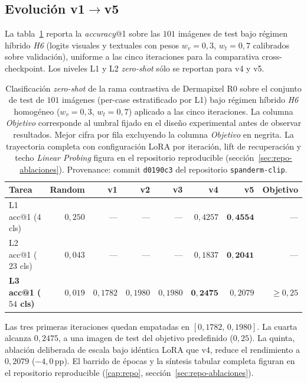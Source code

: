 \subsection{Evolución v1$\to$v5}

La tabla~\ref{tab:spanderm-zs} reporta la \emph{accuracy}@1 sobre las
$101$ imágenes de test bajo régimen híbrido \emph{H6} (logits visuales
y textuales con pesos $w_v = 0{,}3$, $w_t = 0{,}7$ calibrados sobre
validación), uniforme a las cinco iteraciones para la comparativa
cross-checkpoint. Los niveles L1 y L2 \emph{zero-shot} sólo se reportan
para v4 y v5.

\begin{table}[htbp]
\centering
\footnotesize
\setlength{\tabcolsep}{3pt}
\renewcommand{\arraystretch}{0.95}
\caption{Clasificación \emph{zero-shot} de la rama contrastiva de
Dermapixel R0 sobre el
conjunto de test de $101$ imágenes (per-case estratificado por
L1) bajo régimen híbrido \emph{H6} homogéneo
($w_v = 0{,}3$, $w_t = 0{,}7$) aplicado a las cinco iteraciones.
La columna \emph{Objetivo} corresponde al umbral fijado en el
diseño experimental antes de observar resultados. Mejor cifra
por fila excluyendo la columna \emph{Objetivo} en negrita.
La trayectoria completa con configuración LoRA por iteración,
lift de recuperación y techo \emph{Linear Probing} figura en el
repositorio reproducible (sección~\ref{sec:repo-ablaciones}).
Provenance: commit \texttt{d0190c3} del repositorio
\texttt{spanderm-clip}.}
\label{tab:spanderm-zs}
\begin{tabular}{lrrrrrrr}
\hline
Tarea                        & Random    & v1                  & v2                  & v3                  & v4                  & v5                  & Objetivo \\
\hline
L1 acc@1 ($4$ cls)            & $0{,}250$ & ---                 & ---                 & ---                 & $0{,}4257$          & $\mathbf{0{,}4554}$ & ---           \\
L2 acc@1 ($23$ cls)           & $0{,}043$ & ---                 & ---                 & ---                 & $0{,}1837$          & $\mathbf{0{,}2041}$ & ---           \\
\textbf{L3 acc@1 ($54$ cls)}  & $0{,}019$ & $0{,}1782$          & $0{,}1980$          & $0{,}1980$          & $\mathbf{0{,}2475}$ & $0{,}2079$          & $\geq 0{,}25$ \\
\hline
\end{tabular}
\end{table}

Las tres primeras iteraciones quedan empatadas en
$[0{,}1782,\,0{,}1980]$. La cuarta alcanza $0{,}2475$, a una imagen de
test del objetivo predefinido ($0{,}25$). La quinta, ablación
deliberada de escala bajo idéntica LoRA que v4, reduce el rendimiento a
$0{,}2079$ ($-4{,}0$\,pp). El barrido de épocas y la síntesis tabular
completa figuran en el repositorio reproducible (\ref{cap:repo},
sección~\ref{sec:repo-ablaciones}).

